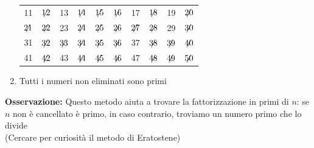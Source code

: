 \documentclass[12pt, letterpaper]{report}
\begin{document}
\begin{enumerate}
\begin{tabular}{c c c c c c c c c c}
				11 & $\centernot{12}$ & 13 & $\centernot{14}$ & $\centernot{15}$ & $\centernot{16}$ & 17 & $\centernot{18}$ & 19 & $\centernot{20}$ \\
				$\centernot{21}$ & $\centernot{22}$ & 23 & $\centernot{24}$ & $\centernot{25}$ & $\centernot{26}$ & $\centernot{27}$ & $\centernot{28}$ & 29 & $\centernot{30}$ \\
				31 & $\centernot{32}$ & $\centernot{33}$ & $\centernot{34}$ & $\centernot{35}$ & $\centernot{36}$ & 37 & $\centernot{38}$ & $\centernot{39}$ & $\centernot{40}$ \\
				41 & $\centernot{42}$ & 43 & $\centernot{44}$ & $\centernot{45}$ & $\centernot{46}$ & 47 & $\centernot{48}$ & $\centernot{49}$ & $\centernot{50}$
			\end{tabular}
			\item Tutti i numeri non eliminati sono primi
		\end{enumerate}
		\textbf{Osservazione:} Questo metodo aiuta a trovare la fattorizzazione in primi di $n$: se $n$ non è cancellato è primo, in caso contrario, troviamo un numero primo che lo divide \\
		(Cercare per curiosità il metodo di Eratostene)
\end{document}
